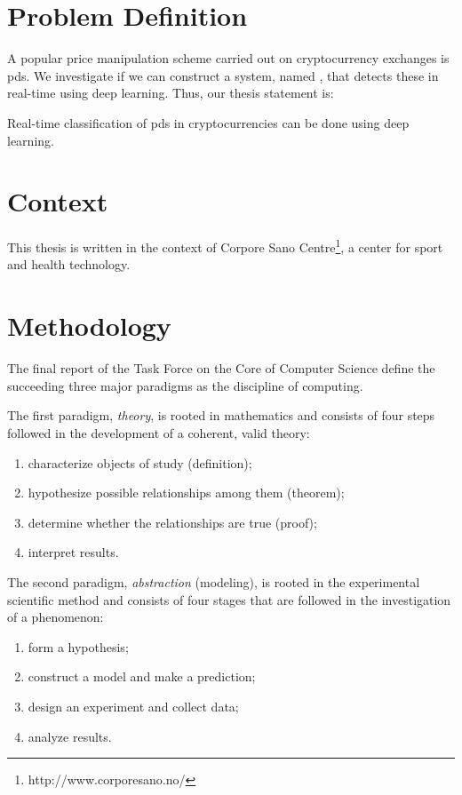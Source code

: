\section{Problem Definition}\label{sec:problem_definition}
A popular price manipulation scheme carried out on cryptocurrency exchanges is \acp{pd}. We investigate if we can construct a system, named \project, that detects these in real-time using deep learning. Thus, our thesis statement is:

\begin{displayquote}
    \begin{em}
    Real-time classification of \acfp{pd} in cryptocurrencies can be done using deep learning.
    \end{em}
\end{displayquote}

\section{Context}\label{sec:context}
This thesis is written in the context of Corpore Sano Centre\footnote{http://www.corporesano.no/}, a center for sport and health technology.

\section{Methodology}\label{sec:methodology}
The final report of the Task Force on the Core of Computer Science\cite{computing_as_a_discipline} define the succeeding three major paradigms as the discipline of computing.

The first paradigm, \emph{theory}, is rooted in mathematics and consists of four steps followed in the development of a coherent, valid theory: 
\begin{enumerate}
    \item characterize objects of study (definition);
    \item hypothesize possible relationships among them (theorem);
    \item determine whether the relationships are true (proof); 
    \item interpret results.
\end{enumerate}

The second paradigm, \emph{abstraction} (modeling), is rooted in the experimental scientific method and consists of four stages that are followed in the investigation of a phenomenon: 
\begin{enumerate}
    \item form a hypothesis;
    \item construct a model and make a prediction;
    \item design an experiment and collect data;
    \item analyze results.
\end{enumerate}

